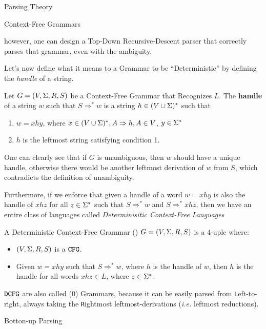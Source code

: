\begin{section}{Parsing Theory}
\begin{subsection}{Context-Free Grammars}

however, one can design a Top-Down Recursive-Descent parser that correctly
parses that grammar, even with the ambiguity.

Let's now define what it means to a Grammar to be ``Deterministic'' by
defining the \textit{handle} of a string.

\begin{definition}
	Let $G = (V, \Sigma, R, S)$ be a Context-Free Grammar that Recognizes $L$.
	The \textbf{handle} of a string $w$ such that $S \Rightarrow^* w$ is a string
	$h \in (V \cup \Sigma)^*$ such that
	\begin{enumerate}
	  \item $w = xhy$, where $x \in (V \cup \Sigma)^*, A \Rightarrow h, A \in V$,
	  $y \in \Sigma^*$
	  \item $h$ is the leftmost string satisfying condition 1.
	\end{enumerate}
\end{definition}

One can clearly see that if $G$ is unambiguous, then $w$ should have a unique
handle, otherwise there would be another leftmost derivation of $w$ from $S$, which
contradicts the definition of unambiguity.

Furthermore, if we enforce that given a handle of a word $w = xhy$
is also the handle of $xhz $ for all $z \in \Sigma^*$ such that $S \Rightarrow^* w$ and
$S \Rightarrow^* xhz$, then we have an entire
class of languages called \textit{Determinisitic Context-Free Languages}

\begin{definition}
A Deterministic Context-Free Grammar () $G = (V, \Sigma, R, S)$ is a 4-uple where:
	\begin{itemize}
		\item $(V, \Sigma, R, S)$ is a $\texttt{CFG}$.
		\item Given $w = xhy$ such that $S \Rightarrow^* w$, where $h$ is the handle
		of $w$, then $h$ is the handle for all words $xhz \in L$, where $z \in \Sigma^*$.
	\end{itemize}
\end{definition}

$\texttt{DCFG}$ are also called (0) Grammars, because it can
be easily parsed from \texttt{L}eft-to-right, always taking the \texttt{R}ightmost
leftmost-derivations (\textit{i.e.} leftmost reductions).

\end{subsection}
\begin{subsection}{Botton-up Parsing}


\end{subsection}
\end{section}
